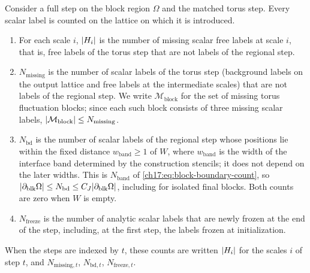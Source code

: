\begin{definition}\label{ch17:def:counts}
Consider a full step on the block region $\Omega$ and the matched torus step. Every scalar label is counted on the lattice on which it is introduced.
\begin{enumerate}
\item For each scale $i$, $\lvert H_i\rvert$ is the number of missing scalar free labels at scale $i$, that is, free labels of the torus step that are not labels of the regional step.
\item $N_{\mathrm{missing}}$ is the number of scalar labels of the torus step (background labels on the output lattice and free labels at the intermediate scales) that are not labels of the regional step. We write $\mathcal M_{\mathrm{block}}$ for the set of missing torus fluctuation blocks; since each such block consists of three missing scalar labels, $\lvert \mathcal M_{\mathrm{block}}\rvert\le N_{\mathrm{missing}}$.
\item $N_{\mathrm{bd}}$ is the number of scalar labels of the regional step whose positions lie within the fixed distance $w_{\mathrm{band}}\ge1$ of $W$, where $w_{\mathrm{band}}$ is the width of the interface band determined by the construction stencils; it does not depend on the later widths. This is $N_{\mathrm{band}}$ of \eqref{ch17:eq:block-boundary-count}, so $\lvert \partial_{\mathrm{blk}}\Omega\rvert\le N_{\mathrm{bd}}\le C_J\lvert \partial_{\mathrm{blk}}\Omega\rvert$, including for isolated final blocks. Both counts are zero when $W$ is empty.
\item $N_{\mathrm{freeze}}$ is the number of analytic scalar labels that are newly frozen at the end of the step, including, at the first step, the labels frozen at initialization.
\end{enumerate}
When the steps are indexed by $t$, these counts are written $\lvert H_i\rvert$ for the scales $i$ of step $t$, and $N_{\mathrm{missing},t}$, $N_{\mathrm{bd},t}$, $N_{\mathrm{freeze},t}$.
\end{definition}

